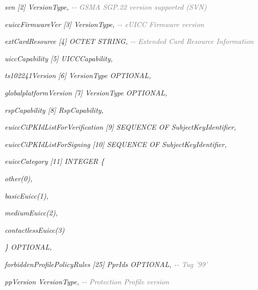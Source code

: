\documentclass[10pt, oneside]{book}
\begin{document}
\hspace{0.75cm} \textit{svn [2] VersionType, \textcolor{gray}{{-}{-} GSMA SGP.22 version supported (SVN)}}

\hspace{0.75cm} \textit{euiccFirmwareVer [3] VersionType, \textcolor{gray}{{-}{-} eUICC Firmware version}}

\hspace{0.75cm} \textit{extCardResource [4] OCTET STRING, \textcolor{gray}{{-}{-} Extended Card Resource Information}}

\hspace{0.75cm} \textit{uiccCapability [5] UICCCapability,}

\hspace{0.75cm} \textit{ts102241Version [6] VersionType OPTIONAL,}

\hspace{0.75cm} \textit{globalplatformVersion [7] VersionType OPTIONAL,}

\hspace{0.75cm} \textit{rspCapability [8] RspCapability,}

\hspace{0.75cm} \textit{euiccCiPKIdListForVerification [9] SEQUENCE OF SubjectKeyIdentifier,}

\hspace{0.75cm} \textit{euiccCiPKIdListForSigning [10] SEQUENCE OF SubjectKeyIdentifier,}

\hspace{0.75cm} \textit{euiccCategory [11] INTEGER \{}

\hspace{1.5cm} \textit{other(0),}

\hspace{1.5cm} \textit{basicEuicc(1),}

\hspace{1.5cm} \textit{mediumEuicc(2),}

\hspace{1.5cm} \textit{contactlessEuicc(3)}

\hspace{0.75cm} \textit{\} OPTIONAL,}

\hspace{0.75cm} \textit{forbiddenProfilePolicyRules [25] PprIds OPTIONAL, \textcolor{gray}{{-}{-} Tag '99'}}

\hspace{0.75cm} \textit{ppVersion VersionType, \textcolor{gray}{{-}{-} Protection Profile version}}
\end{document}

